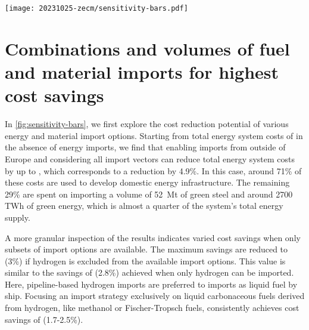 

\begin{figure*}
    \texttt{[image: 20231025-zecm/sensitivity-bars.pdf]}
    \caption{\textbf{Potential for cost reductions with reduced sets of import options.}
        Subsets of available import options are sorted by ascending cost reduction potential. 
        Top panel shows profile of total cost savings.
        Bottom panel shows composition and extent of imports in relation to total energy system costs.
        Percentage numbers in bar plot indicate the share of total system costs spent on domestic energy infrastructure.
        Alternative versions of this figure with higher and lower import cost assumptions are included in the supplementary material.
    }
    \label{fig:sensitivity-bars}
\end{figure*}

\section*{Combinations and volumes of fuel and material imports for highest cost savings}

In \cref{fig:sensitivity-bars}, we first explore the cost reduction potential of
various energy and material import options. Starting from total energy system
costs of  in the absence of energy imports, we find that enabling
imports from outside of Europe and considering all import vectors can reduce
total energy system costs by up to , which corresponds to a reduction
by 4.9\%. In this case, around 71\% of these costs are used to develop domestic
energy infrastructure. The remaining 29\% are spent on importing a volume of
52~Mt of green steel and around 2700 TWh of green energy, which is almost a
quarter of the system's total energy supply.

A more granular inspection of the results indicates varied cost savings when
only subsets of import options are available. The maximum savings are reduced to
 (3\%) if hydrogen is excluded from the available import options.
This value is similar to the savings of  (2.8\%) achieved when only
hydrogen can be imported. Here, pipeline-based hydrogen imports are preferred to
imports as liquid fuel by ship. Focusing an import strategy exclusively on
liquid carbonaceous fuels derived from hydrogen, like methanol or
Fischer-Tropsch fuels, consistently achieves cost savings of 
(1.7-2.5\%).

